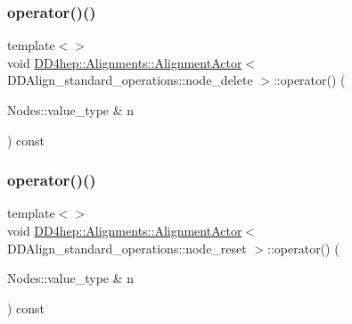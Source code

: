 \hypertarget{class_d_d4hep_1_1_alignments_1_1_alignment_actor_ab933803d7b23df70f2126470c6465029}{}\label{class_d_d4hep_1_1_alignments_1_1_alignment_actor_ab933803d7b23df70f2126470c6465029} 
\subsubsection{\texorpdfstring{operator()()}{operator()()}\hspace{0.1cm}{\footnotesize\ttfamily [3/5]}}
{\footnotesize\ttfamily template$<$$>$ \\
void \hyperlink{class_d_d4hep_1_1_alignments_1_1_alignment_actor}{D\+D4hep\+::\+Alignments\+::\+Alignment\+Actor}$<$ D\+D\+Align\+\_\+standard\+\_\+operations\+::node\+\_\+delete $>$\+::operator() (\begin{DoxyParamCaption}\item[{Nodes\+::value\+\_\+type \&}]{n }\end{DoxyParamCaption}) const}

\hypertarget{class_d_d4hep_1_1_alignments_1_1_alignment_actor_a58ec7e8e577e4654230f475aee598053}{}\label{class_d_d4hep_1_1_alignments_1_1_alignment_actor_a58ec7e8e577e4654230f475aee598053} 
\subsubsection{\texorpdfstring{operator()()}{operator()()}\hspace{0.1cm}{\footnotesize\ttfamily [4/5]}}
{\footnotesize\ttfamily template$<$$>$ \\
void \hyperlink{class_d_d4hep_1_1_alignments_1_1_alignment_actor}{D\+D4hep\+::\+Alignments\+::\+Alignment\+Actor}$<$ D\+D\+Align\+\_\+standard\+\_\+operations\+::node\+\_\+reset $>$\+::operator() (\begin{DoxyParamCaption}\item[{Nodes\+::value\+\_\+type \&}]{n }\end{DoxyParamCaption}) const}

\hypertarget{class_d_d4hep_1_1_alignments_1_1_alignment_actor_aeccacf0e444121e6296b9d33135a23cc}{}\label{class_d_d4hep_1_1_alignments_1_1_alignment_actor_aeccacf0e444121e6296b9d33135a23cc} 
